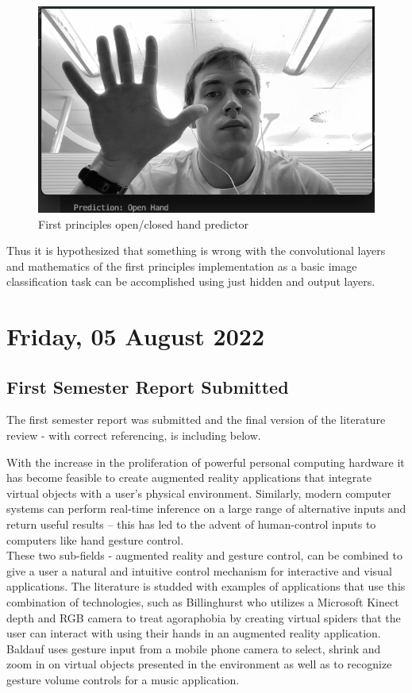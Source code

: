 \begin{figure}[h]
    \centering
    \includegraphics[width=0.7\linewidth]{figures/layers_gesture_predictor2.png}
    \caption{First principles open/closed hand predictor}
    \label{fig:layers_gesture_predictor2}
\end{figure}

Thus it is hypothesized that something is wrong with the convolutional layers and mathematics of the first principles implementation as a basic image classification task can be accomplished using just hidden and output layers.


\section[2022/08/05]{Friday, 05 August 2022}

\subsection{First Semester Report Submitted}

The first semester report was submitted and the final version of the literature review - with correct referencing, is including below.

With the increase in the proliferation of powerful personal computing hardware it has become feasible to create augmented reality applications that integrate virtual objects with a user’s physical environment. Similarly, modern computer systems can perform real-time inference on a large range of alternative inputs and return useful results – this has led to the advent of human-control inputs to computers like hand gesture control. \\

These two sub-fields - augmented reality and gesture control, can be combined to give a user a natural and intuitive control mechanism for interactive and visual applications. The literature is studded with examples of applications that use this combination of technologies, such as Billinghurst \cite{Australia_spiders} who utilizes a Microsoft Kinect depth and RGB camera to treat agoraphobia by creating virtual spiders that the user can interact with using their hands in an augmented reality application. Baldauf \cite{markerless_ar} uses gesture input from a mobile phone camera to select, shrink and zoom in on virtual objects presented in the environment as well as to recognize gesture volume controls for a music application. \\


